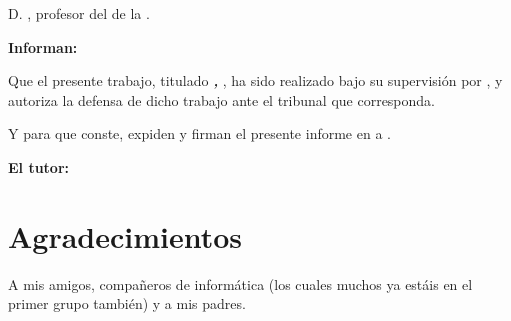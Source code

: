 D. \textbf{\myProf}, profesor del \myDepartment de la \myUni.

\vspace{0.5cm}

\textbf{Informan:}

\vspace{0.5cm}

Que el presente trabajo, titulado \textit{\textbf{\myTitle, \mySubTitle}}, ha sido realizado bajo su supervisión por \textbf{\myName}, y autoriza la defensa de dicho trabajo ante el tribunal que corresponda.

\vspace{0.5cm}

Y para que conste, expiden y firman el presente informe en \myLocation a \myTime.

\vspace{1cm}

\textbf{El tutor:}

\vspace{5cm}

\noindent \textbf{\myProf}

\chapter*{Agradecimientos}
\thispagestyle{empty}

       \vspace{1cm}


A mis amigos, compañeros de informática (los cuales muchos ya estáis en el primer grupo también) y a mis padres.
